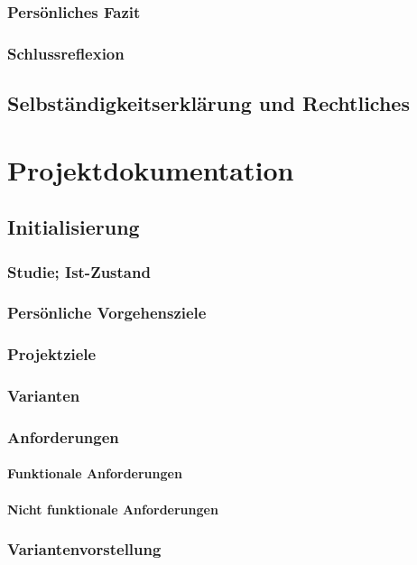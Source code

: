 \documentclass{report}
\begin{document}
\section{Persönliches Fazit}
\section{Schlussreflexion}

\chapter{Selbständigkeitserklärung und Rechtliches}

\part{Projektdokumentation}

\chapter{Initialisierung}
\section{Studie; Ist-Zustand}
\section{Persönliche Vorgehensziele}
\section{Projektziele}
\section{Varianten}
\section{Anforderungen}
\subsection{Funktionale Anforderungen}
\subsection{Nicht funktionale Anforderungen}
\section{Variantenvorstellung}
\end{document}
